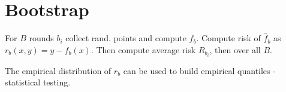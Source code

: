 \section*{Bootstrap}
For $B$ rounds $b_i$ collect rand. points and compute $\hat{f}_b$. Compute risk of $\hat{f}_b$ as $r_b(x,y) = y-\hat{f}_b(x)$. Then compute average risk $R_{b_i}$, then over all $B$.

The empirical distribution of $r_b$ can be used to build empirical quantiles - statistical testing.